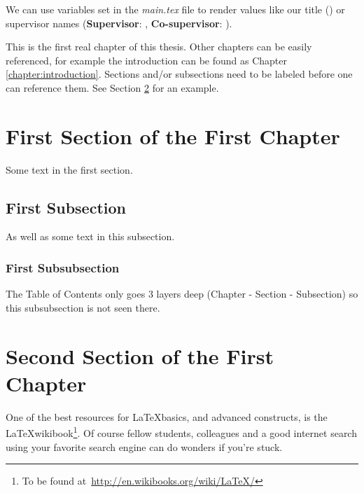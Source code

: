 We can use variables set in the \textit{main.tex} file to render values like our title (\doctitle) or supervisor names (\textbf{Supervisor}: \supervisor, \textbf{Co-supervisor}: \cosupervisor{}).

This is the first real chapter of this thesis. Other chapters can be easily referenced, for example the introduction can be found as Chapter \ref{chapter:introduction}. Sections and/or subsections need to be labeled before one can reference them. See Section \ref{sec:second-section} for an example.

\section{First Section of the First Chapter}
Some text in the first section.
\subsection{First Subsection}
As well as some text in this subsection.
\subsubsection{First Subsubsection}
The Table of Contents only goes 3 layers deep (Chapter - Section - Subsection) so this subsubsection is not seen there.

\section{Second Section of the First Chapter}\label{sec:second-section}

One of the best resources for \LaTeX basics, and advanced constructs, is the \LaTeX wikibook\footnote{To be found at~\url{http://en.wikibooks.org/wiki/LaTeX/}}. Of course fellow students, colleagues and a good internet search using your favorite search engine can do wonders if you're stuck. 
